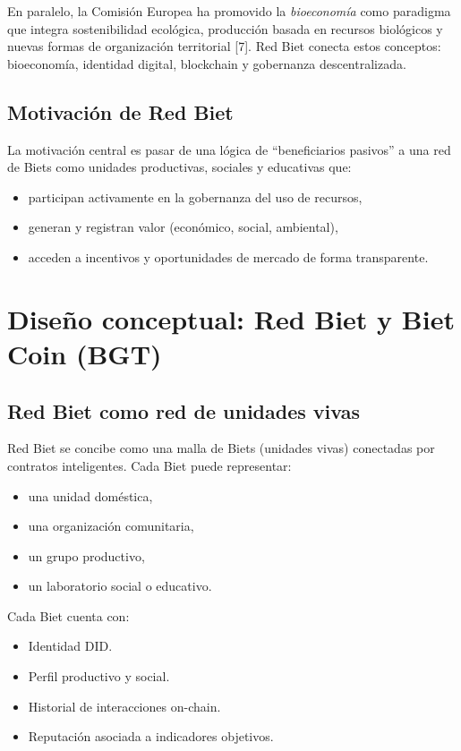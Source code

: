 \documentclass[12pt]{report}
\begin{document}
En paralelo, la Comisión Europea ha promovido la \textit{bioeconomía} como paradigma que integra sostenibilidad ecológica, producción basada en recursos biológicos y nuevas formas de organización territorial [7]. 
Red Biet conecta estos conceptos: bioeconomía, identidad digital, blockchain y gobernanza descentralizada.

\section{Motivación de Red Biet}
La motivación central es pasar de una lógica de “beneficiarios pasivos” a una red de Biets como unidades productivas, sociales y educativas que:
\begin{itemize}
    \item participan activamente en la gobernanza del uso de recursos,
    \item generan y registran valor (económico, social, ambiental),
    \item acceden a incentivos y oportunidades de mercado de forma transparente.
\end{itemize}

\chapter{Diseño conceptual: Red Biet y Biet Coin (BGT)}

\section{Red Biet como red de unidades vivas}
Red Biet se concibe como una malla de Biets (unidades vivas) conectadas por contratos inteligentes. 
Cada Biet puede representar:
\begin{itemize}
    \item una unidad doméstica,
    \item una organización comunitaria,
    \item un grupo productivo,
    \item un laboratorio social o educativo.
\end{itemize}

Cada Biet cuenta con:
\begin{itemize}
    \item Identidad DID.
    \item Perfil productivo y social.
    \item Historial de interacciones on-chain.
    \item Reputación asociada a indicadores objetivos.
\end{itemize}
\end{document}
